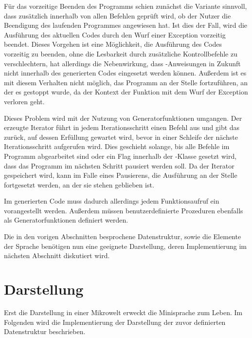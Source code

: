 Für das vorzeitige Beenden des Programms schien zunächst die Variante sinnvoll, dass zusätzlich innerhalb von allen Befehlen geprüft wird, ob der Nutzer die Beendigung des laufenden Programmes angewiesen hat. Ist dies der Fall, wird die Ausführung des aktuellen Codes durch den Wurf einer Exception vorzeitig beendet. Dieses Vorgehen ist eine Möglichkeit, die Ausführung des Codes vorzeitig zu beenden, ohne die Lesbarkeit durch zusätzliche Kontrollbefehle zu verschlechtern, hat allerdings die Nebenwirkung, dass -Anweisungen in Zukunft nicht innerhalb des generierten Codes eingesetzt werden können. Außerdem ist es mit diesem Verhalten nicht möglich, das Programm an der Stelle fortzuführen, an der es gestoppt wurde, da der Kontext der Funktion mit dem Wurf der Exception verloren geht.

Dieses Problem wird mit der Nutzung von Generatorfunktionen umgangen. Der erzeugte Iterator führt in jedem Iterationsschritt einen Befehl aus und gibt das  zurück, auf dessen Erfüllung gewartet wird, bevor in einer Schleife der nächste Iterationsschritt aufgerufen wird. Dies geschieht solange, bis alle Befehle im Programm abgearbeitet sind oder ein Flag innerhalb der -Klasse gesetzt wird, dass das Programm im nächsten Schritt pausiert werden soll. Da der Iterator gespeichert wird, kann im Falle eines Pausierens, die Ausführung an der Stelle fortgesetzt werden, an der sie stehen geblieben ist.

Im generierten Code muss dadurch allerdings jedem Funktionsaufruf ein  vorangestellt werden. Außerdem müssen benutzerdefinierte Prozeduren ebenfalls als Generatorfunktionen definiert werden.

Die in den vorigen Abschnitten besprochene Datenstruktur, sowie die Elemente der Sprache benötigen nun eine geeignete Darstellung, deren Implementierung im nächsten Abschnitt diskutiert wird.

\section{Darstellung}
\label{sec:implementation:rendering}

Erst die Darstellung in einer Mikrowelt erweckt die Minisprache zum Leben. Im Folgenden wird die Implementierung der Darstellung der zuvor definierten Datenstruktur beschrieben.

